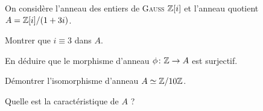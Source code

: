 \documentclass[french]{report}
\begin{document}
\begin{exo}
    On considère l'anneau des entiers de \textsc{Gauss} \(\mathbb{Z}[i]\) et l'anneau quotient
    \(A = \mathbb{Z}[i]/(1+3i)\).
    \begin{q}{1}
        Montrer que \(i\equiv 3\) dans \(A\).
    \end{q}
    \begin{q}{2}
        En déduire que le morphisme d'anneau \(\phi\colon \mathbb{Z}\to A\) est surjectif.
    \end{q}
    \begin{q}{3}
        Démontrer l'isomorphisme d'anneau \(A\simeq \mathbb{Z}/10\mathbb{Z}\).
    \end{q}
    \begin{q}{4}
        Quelle est la caractéristique de \(A\) ?
    \end{q}
\end{exo}
\end{document}
